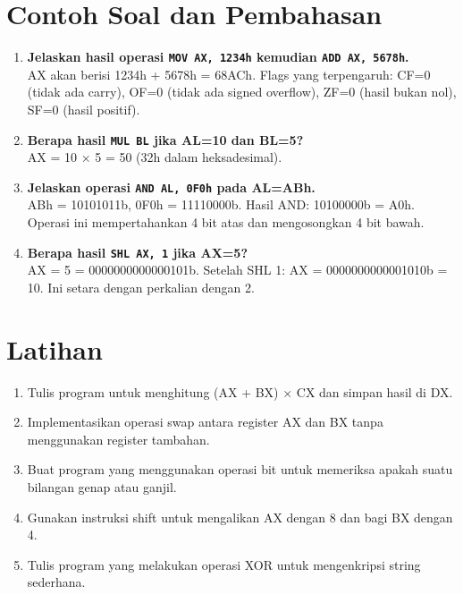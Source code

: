 \section{Contoh Soal dan Pembahasan}\label{sec:instruksi-dasar-contoh}
\begin{enumerate}
    \item \textbf{Jelaskan hasil operasi \texttt{MOV AX, 1234h} kemudian \texttt{ADD AX, 5678h}.}\\
    AX akan berisi 1234h + 5678h = 68ACh. Flags yang terpengaruh: CF=0 (tidak ada carry), OF=0 (tidak ada signed overflow), ZF=0 (hasil bukan nol), SF=0 (hasil positif).

    \item \textbf{Berapa hasil \texttt{MUL BL} jika AL=10 dan BL=5?}\\
    AX = 10 × 5 = 50 (32h dalam heksadesimal).

    \item \textbf{Jelaskan operasi \texttt{AND AL, 0F0h} pada AL=ABh.}\\
    ABh = 10101011b, 0F0h = 11110000b. Hasil AND: 10100000b = A0h. Operasi ini mempertahankan 4 bit atas dan mengosongkan 4 bit bawah.

    \item \textbf{Berapa hasil \texttt{SHL AX, 1} jika AX=5?}\\
    AX = 5 = 0000000000000101b. Setelah SHL 1: AX = 0000000000001010b = 10. Ini setara dengan perkalian dengan 2.
\end{enumerate}

\section{Latihan}\label{sec:instruksi-dasar-latihan}
\begin{enumerate}
    \item Tulis program untuk menghitung (AX + BX) × CX dan simpan hasil di DX.
    \item Implementasikan operasi swap antara register AX dan BX tanpa menggunakan register tambahan.
    \item Buat program yang menggunakan operasi bit untuk memeriksa apakah suatu bilangan genap atau ganjil.
    \item Gunakan instruksi shift untuk mengalikan AX dengan 8 dan bagi BX dengan 4.
    \item Tulis program yang melakukan operasi XOR untuk mengenkripsi string sederhana.
\end{enumerate}

